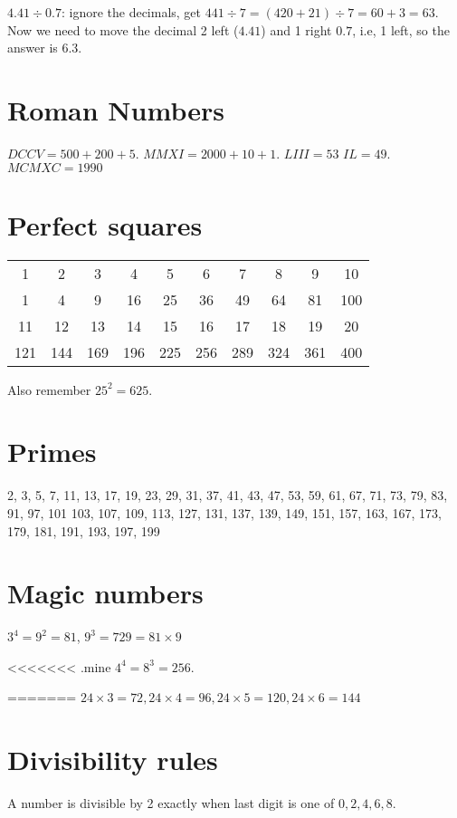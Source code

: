 \documentclass[fullpage,twocolumn]{article}
\begin{document}
$4.41 \div 0.7$: ignore the decimals, get $441\div 7 = (420 + 21) \div 7 = 60 + 3 = 63$.
Now we need to move the decimal 2 left ($4.41$) and 1 right $0.7$, i.e, 1 left,
so the answer is $6.3$.

\section{Roman Numbers}

$DCCV = 500 + 200 + 5$. $MMXI = 2000 + 10  + 1$. $LIII = 53$ $IL = 49$. $MCMXC = 1990$



\section{Perfect squares}
{\tiny
\begin{tabular}{|c|c|c|c|c|c|c|c|c|c|} \hline
1 & 2 & 3 & 4 & 5 & 6 & 7 & 8 & 9 & 10 \\ 
1 & 4 & 9 & 16 & 25 & 36 & 49 & 64 & 81 & 100 \\ \hline
11 & 12 & 13 & 14 & 15 & 16 & 17 & 18 & 19 & 20 \\ 
121 & 144 & 169 & 196 & 225 & 256 & 289 & 324 & 361 & 400 \\ \hline
\end{tabular}
}

Also remember $25^2 = 625$.

\section{Primes}
2, 3, 5, 7, 11, 13, 17, 19, 23, 29, 31, 37, 41, 43, 47, 53, 59, 61, 67, 71, 73, 79, 83, 91, 97, 101    103, 107, 109, 113, 127, 131, 137, 139, 149, 151, 157, 163, 167, 173, 179, 181, 191, 193, 197, 199

\section{Magic numbers}
$3^4 = 9^2 = 81$, $9^3 = 729 = 81 \times 9$

<<<<<<< .mine
$4^4 = 8^3 = 256$.

=======
$24 \times 3 = 72, 24 \times 4 = 96, 24  \times 5 = 120, 24 \times 6 = 144$

\section{Divisibility rules}

A number is divisible by 2 exactly when last digit is one of $0,2,4,6,8$.
\end{document}
